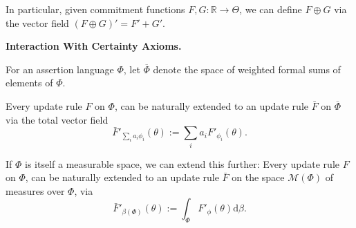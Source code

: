 \documentclass{article}
\newcommand{\ext}[1]{\overline #1} %
\def\cofunc{commitment function}
\begin{document}
In particular, given \cofunc s $F, G : \mathbb R \to \Theta$, we can define
$F \oplus G$ via the vector field $(F \oplus G)' = F' + G'$.

\begin{wip}
	\textbf{Interaction With Certainty Axioms.}

\end{wip}

\begin{defn}
	For an assertion language $\Phi$, let $\ext\Phi$ denote
	the space of weighted formal sums of elements of $\Phi$.
\end{defn}

\begin{prop}
	Every  update rule $F$ on $\Phi$, can be naturally extended to an update rule
	$\bar F$ on $\ext\Phi$
	via the total vector field
	\[
		\bar F'_{\textstyle\sum_i a_i \phi_i} ( \theta ) := \sum_{i} a_i F'_{\phi_i}(\theta).
	\]
%
\end{prop}

If $\Phi$ is itself a measurable space, we can extend this further:
Every  update rule $F$ on $\Phi$, can be naturally extended to an update rule $\bar F$ on the space $\mathcal M(\Phi)$ of measures over $\Phi$, via
\[
	\bar F'_{\beta(\Phi)}( \theta ) := \int_{\Phi} F'_\phi(\theta) \mathrm d\beta.
\]



%
%
\end{document}
